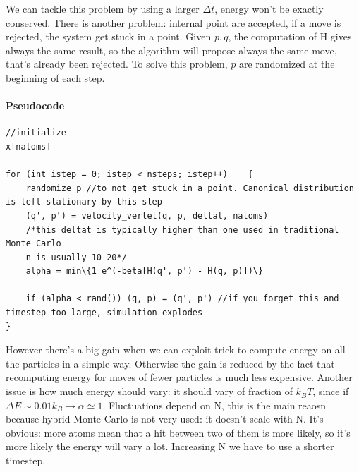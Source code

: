 \documentclass[a4paper, italian, openany]{book}
\begin{document}
We can tackle this problem by using a larger $\Delta t$, energy won't be exactly conserved. There is another problem: internal point are accepted, if a move is rejected, the system get stuck in a point. Given $p,q$, the computation of H gives always the same result, so the algorithm will propose always the same move, that's already been rejected. To solve this problem, $p$ are randomized at the beginning of each step.

\paragraph{Pseudocode}

\begin{lstlisting}
//initialize
x[natoms]

for (int istep = 0; istep < nsteps; istep++)	{
	randomize p //to not get stuck in a point. Canonical distribution is left stationary by this step
	(q', p') = velocity_verlet(q, p, deltat, natoms)
	/*this deltat is typically higher than one used in traditional Monte Carlo
	n is usually 10-20*/
	alpha = min\{1 e^(-beta[H(q', p') - H(q, p)])\}
	
	if (alpha < rand())	(q, p) = (q', p') //if you forget this and timestep too large, simulation explodes
}
\end{lstlisting}

However there's a big gain when we can exploit trick to compute energy on all the particles in a simple way. Otherwise the gain is reduced by the fact that recomputing energy for moves of fewer particles is much less expensive.\newline
Another issue is how much energy should vary: it should vary of fraction of $k_B T$, since if $\Delta E \sim 0.01 k_B \rightarrow \alpha \simeq 1$. Fluctuations depend on N, this is the main reaosn because hybrid Monte Carlo is not very used: it doesn't scale with N. 
It's obvious: more atoms mean that a hit between two of them is more likely, so it's more likely the energy will vary a lot. Increasing N we have to use a shorter timestep.
\end{document}
